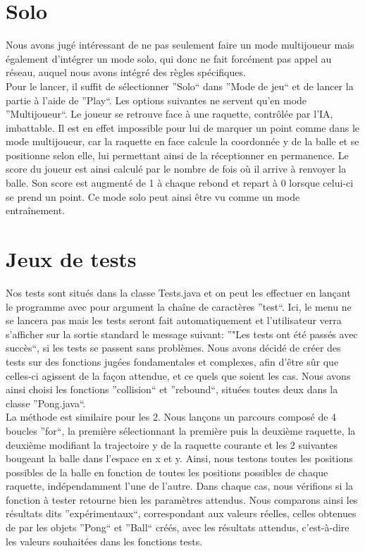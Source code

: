 \section{Solo}

Nous avons jugé intéressant de ne pas seulement faire un mode multijoueur mais également d'intégrer un mode solo, 
qui donc ne fait forcément pas appel au réseau, auquel nous avons intégré des règles spécifiques.
\\
Pour le lancer, il suffit de sélectionner ''Solo`` dans ''Mode de jeu`` et de lancer la partie à l'aide de ''Play``. 
Les options suivantes ne servent qu'en mode ''Multijoueur``. Le joueur se retrouve face à une raquette, contrôlée par l'IA, 
imbattable. Il est en effet impossible pour lui de marquer un point comme dans le mode multijoueur, car la raquette 
en face calcule la coordonnée y de la balle et se positionne selon elle, lui permettant ainsi de la réceptionner en permanence. 
Le score du joueur est ainsi calculé par le nombre de fois où il arrive à renvoyer la balle. Son score est augmenté de 1 
à chaque rebond et repart à 0 lorsque celui-ci se prend un point. Ce mode solo peut ainsi être vu comme un mode entraînement.

\section{Jeux de tests}

Nos tests sont situés dans la classe Tests.java et on peut les effectuer en lançant le programme avec pour argument 
la chaîne de caractères 
''test``.
Ici, le menu ne se lancera pas mais les tests seront fait automatiquement et l'utilisateur verra s'afficher sur la sortie 
standard le message suivant: ''"Les tests ont été passés avec succès``, si les tests se passent sans problèmes.
Nous avons décidé de créer des tests sur des fonctions jugées fondamentales et complexes, afin d'être sûr que celles-ci 
agissent de la façon attendue, et ce quels que soient les cas. Nous avons ainsi choisi les fonctions ''collision`` et 
''rebound``, situées toutes deux dans la classe ''Pong.java``.
\\
La méthode est similaire pour les 2. Nous lançons un parcours composé de 4 boucles ''for``, la première sélectionnant 
la première puis la deuxième raquette, la deuxième modifiant la trajectoire y de la raquette courante et les 2 suivantes 
bougeant la balle dans l'espace en x et y. Ainsi, nous testons toutes les positions possibles de la balle en fonction de 
toutes les positions possibles de chaque raquette, indépendamment l'une de l'autre. Dans chaque cas, nous vérifions 
si la fonction à tester retourne bien les paramètres attendus. Nous comparons ainsi les résultats dits ''expérimentaux``, 
correspondant aux valeurs réelles, celles obtenues de par les objets ''Pong`` et ''Ball`` créés, avec les résultats 
attendus, c'est-à-dire les valeurs souhaitées dans les fonctions tests.

